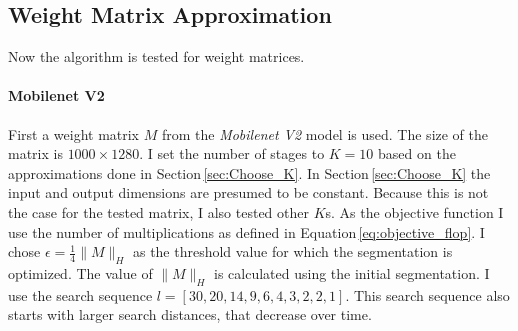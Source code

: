 \documentclass[numbers=noenddot,doctype=mastersthesis,BCOR=15mm,biblatex]{ldvbook}%
\begin{document}
\subsection{Weight Matrix Approximation}
Now the algorithm is tested for weight matrices.


\paragraph{Mobilenet V2}
First a weight matrix $M$ from the \emph{Mobilenet V2} model is used.
The size of the matrix is ${1000 \times 1280}$.
I set the number of stages to $K = 10$ based on the approximations done in Section\,\ref{sec:Choose_K}.
In Section\,\ref{sec:Choose_K} the input and output dimensions are presumed to be constant.
Because this is not the case for the tested matrix, I also tested other $K$s.
As the objective function I use the number of multiplications as defined in Equation\,\ref{eq:objective_flop}.
I chose $\epsilon = \frac{1}{4} \|M\|_H$ as the threshold value for which the segmentation is optimized.
The value of $\|M\|_H$ is calculated using the initial segmentation.
I use the search sequence $l = [30, 20, 14,  9,  6,  4,  3,  2,  2,  1]$.
This search sequence also starts with larger search distances, that decrease over time.
\end{document}
